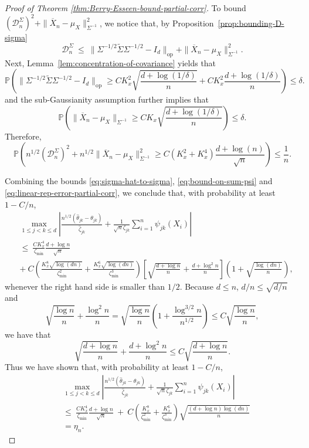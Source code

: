 \documentclass[11pt]{article}
\begin{document}
\begin{appendices}
\begin{proof}[Proof of Theorem \ref{thm:Berry-Esseen-bound-partial-corr}]
To bound $(\mathcal{D}_n^{\Sigma})^2 + \|\overline{X}_n - \mu_X\|_{\Sigma^{-1}}^2$, we notice that, by Proposition~\ref{prop:bounding-D-sigma} 
\[
\mathcal{D}_n^{\Sigma} ~\le~ \|\Sigma^{-1/2}\widetilde{\Sigma}\Sigma^{-1/2} - I_d\|_{\mathrm{op}} + \|\overline{X}_n - \mu_X\|_{\Sigma^{-1}}^2.
\]
Next, Lemma~\ref{lem:concentration-of-covariance} yields that
\[
\mathbb{P}\left(\|\Sigma^{-1/2}\widetilde{\Sigma}\Sigma^{-1/2} - I_d\|_{\mathrm{op}} \ge CK_x^2\sqrt{\frac{d + \log(1/\delta)}{n}} + CK_x^2\frac{d + \log(1/\delta)}{n}\right) \le \delta.
\]
and the sub-Gaussianity assumption further implies that
\[
\mathbb{P}\left(\|\overline{X}_n - \mu_X\|_{\Sigma^{-1}} \ge CK_x\sqrt{\frac{d + \log(1/\delta)}{n}}\right) \le \delta.
\]
Therefore, 
\begin{equation}\label{eq:linear-rep-error-partial-corr}
\mathbb{P}\left(n^{1/2}(\mathcal{D}_n^{\Sigma})^2 + n^{1/2}\|\overline{X}_n - \mu_X\|_{\Sigma^{-1}}^2 \ge C(K_x^2 + K_x^4)\frac{d + \log(n)}{\sqrt{n}}\right) \le \frac{1}{n}.
\end{equation}



Combining the bounds \eqref{eq:sigma-hat-to-sigma}, \eqref{eq:bound-on-sum-psi} and \eqref{eq:linear-rep-error-partial-corr}, we  conclude that, with probability at least $1 - C/n$,
\begin{align*}
&\max_{1\le j < k\le d}\left|\frac{n^{1/2}(\widehat{\theta}_{jk} - \theta_{jk})}{\widehat{\zeta}_{jk}} + \frac{1}{\sqrt{n}\zeta_{jk}}\sum_{i=1}^n \psi_{jk}(X_i)\right|\\ 
~&\le~ \frac{CK_x^4}{\zeta_{\min}}\frac{d + \log n}{\sqrt{n}}\\
~&+~ C\left(\frac{K_x^8\sqrt{\log(dn)}}{\zeta_{\min}^2} + \frac{K_x^6\sqrt{\log(dn)}}{\zeta_{\min}^3}\right)\left[\sqrt{\frac{d + \log n}{n}} + \frac{d + \log^2n}{n}\right]\left(1 + \sqrt{\frac{\log(dn)}{n}}\right),
\end{align*}
whenever the right hand side is smaller than $1/2$.
Because $d \le n$, ${d/n} \le \sqrt{d/n}$ and 
\[
\sqrt{\frac{\log n}{n}} + \frac{\log^2n}{n} = \sqrt{\frac{\log n}{n}}\left(1 + \frac{\log^{3/2}n}{n^{1/2}}\right) \le C\sqrt{\frac{\log n}{n}},
\]
we have that
\[
\sqrt{\frac{d + \log n}{n}} + \frac{d + \log^2n}{n} \le C\sqrt{\frac{d + \log n}{n}}.
\] 
Thus we have shown that, with probability at least $1 - C/n$,
\begin{align*}
&\max_{1\le j < k\le d}\left|\frac{n^{1/2}(\widehat{\theta}_{jk} - \theta_{jk})}{\widehat{\zeta}_{jk}} + \frac{1}{\sqrt{n}\zeta_{jk}}\sum_{i=1}^n \psi_{jk}(X_i)\right|\\ 
~&\le~ \frac{CK_x^4}{\zeta_{\min}}\frac{d + \log n}{\sqrt{n}} ~+~ C\left(\frac{K_x^8}{\zeta_{\min}^2} + \frac{K_x^6}{\zeta_{\min}^3}\right)\sqrt{\frac{(d + \log n)\log(dn)}{n}}\\
~& = \eta_n.
\end{align*}




\end{proof}
\end{appendices}
\end{document}
